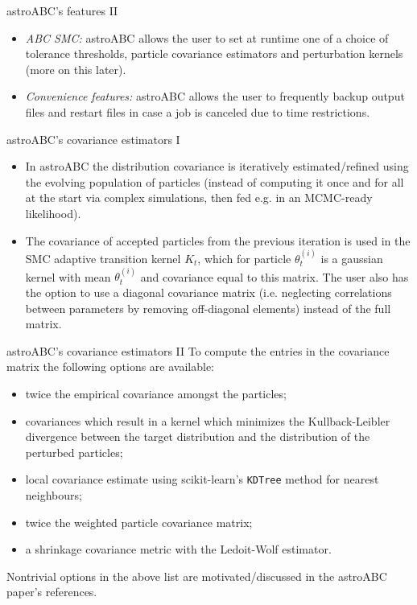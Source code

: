\documentclass{beamer}
\theoremstyle{remark}
\begin{document}
\begin{frame}{astroABC's features II}
\begin{itemize}[<+->]
    \item \textit{ABC SMC:} astroABC allows the user to set at runtime one of a choice of tolerance thresholds, particle covariance estimators and perturbation kernels (more on this later).
    \item \textit{Convenience features:} astroABC allows the user to frequently backup output files and restart files in case a job is canceled due to time restrictions.
\end{itemize}
\end{frame}
\begin{frame}{astroABC's covariance estimators I}
\begin{itemize}[<+->]
    \item In astroABC the distribution covariance is iteratively estimated/refined using the evolving population of particles (instead of computing it once and for all at the start via complex simulations, then fed e.g. in an MCMC-ready likelihood).
    \item The covariance of accepted particles from the previous iteration is used in the SMC adaptive transition kernel $K_t$, which for particle $\theta_t^{(i)}$ is a gaussian kernel with mean $\theta_t^{(i)}$ and covariance equal to this matrix. The user also has the option to use a diagonal covariance matrix (i.e. neglecting correlations between parameters by removing off-diagonal elements) instead of the full matrix.
\end{itemize}
\end{frame}

\begin{frame}{astroABC's covariance estimators II}
To compute the entries in the covariance matrix the following options are available:
\begin{itemize}
    \item twice the empirical covariance amongst the particles;
    \item covariances which result in a kernel which minimizes the Kullback-Leibler divergence between the target distribution and the distribution of the perturbed particles;
    \item local covariance estimate using scikit-learn’s \texttt{KDTree} method for nearest neighbours;
    \item twice the weighted particle covariance matrix;
    \item a shrinkage covariance metric with the Ledoit-Wolf estimator.
\end{itemize}
Nontrivial options in the above list are motivated/discussed in the astroABC paper's references.
\end{frame}
\end{document}
